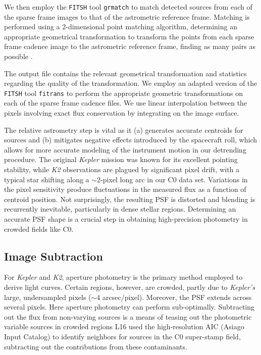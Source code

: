 \documentclass[apjl]{emulateapj}
\begin{document}
We then employ the \texttt{FITSH} tool \texttt{grmatch} to match
detected sources from each of the sparse frame images to that of the
astrometric reference frame. Matching is performed using a 2-dimensional
point matching algorithm, determining an appropriate geometrical
transformation to transform the points from each sparse frame cadence
image to the astrometric reference frame, finding as many pairs as
possible \citep{Pal:2006}.

The output file contains the relevant geometrical transformation and
statistics regarding the quality of the transformation.  We employ an
adapted version of the \texttt{FITSH} tool \texttt{fitrans} to perform
the appropriate geometric transformations on each of the sparse frame
cadence files. We use linear interpolation between the pixels involving
exact flux conservation by integrating on the image surface.

The relative astrometry step is vital as it (a) generates accurate
centroids for sources and (b) mitigates negative effects introduced by
the spacecraft roll, which allows for more accurate modeling of the
instrument motion in our detrending procedure.
The original \textit{Kepler} mission was known for its excellent
pointing stability, while \textit{K2} observations are plagued by
significant pixel drift, with a typical star shifting along a
${\sim}$2-pixel long arc in our C0 data set.  Variations in the pixel
sensitivity produce fluctuations in the measured flux as a function of
centroid position.  Not surprisingly, the resulting PSF is distorted and
blending is recurrently inevitable, particularly in dense stellar
regions.  Determining an accurate PSF shape is a crucial step in
obtaining high-precision photometry in crowded fields like C0.

\subsection{Image Subtraction}
\label{sec:imagesub}

For \textit{Kepler} and \textit{K2}, aperture photometry is the primary
method employed to derive light curves.  Certain regions, however, are
crowded, partly due to \textit{Kepler's} large, undersampled pixels
($\sim$4 arcsec/pixel). Moreover, the PSF extends across several
pixels. Here aperture photometry can perform sub-optimally.  Subtracting
out the flux from non-varying sources is a means of teasing out the
photometric variable sources in crowded regions L16 used the
high-resolution AIC (Asiago Input Catalog) to identify neighbors for
sources in the C0 super-stamp field, subtracting out the contributions
from these contaminants.
\end{document}
